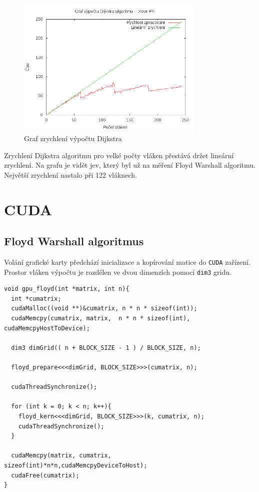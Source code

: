 \documentclass[10pt,a4paper]{article}
\begin{document}
\begin{figure}[H]
  \centering
    \includegraphics[width=0.8\textwidth]{graf_dijkstra_phi.png}
  \caption{Graf zrychlení výpočtu Dijkstra}
  \label{fig:dijkphi}
\end{figure}

Zrychlení Dijkstra algoritmu pro velké počty vláken přestává držet lineární zrychlení. Na grafu je vidět jev, který byl už na měření Floyd Warshall algoritmu. Největší zrychlení nastalo při 122 vláknech.

\section{CUDA}

\subsection{Floyd Warshall algoritmus}

Volání grafické karty předchází inicializace a kopírování matice do \texttt{CUDA} zařízení. Prostor vláken výpočtu je rozdělen ve dvou dimenzích pomocí \texttt{dim3} gridu.

\begin{verbatim}
void gpu_floyd(int *matrix, int n){
  int *cumatrix; 
  cudaMalloc((void **)&cumatrix, n * n * sizeof(int));
  cudaMemcpy(cumatrix, matrix,  n * n * sizeof(int), cudaMemcpyHostToDevice);
  
  dim3 dimGrid(( n + BLOCK_SIZE - 1 ) / BLOCK_SIZE, n);
  
  floyd_prepare<<<dimGrid, BLOCK_SIZE>>>(cumatrix, n);
  
  cudaThreadSynchronize();
     
  for (int k = 0; k < n; k++){
    floyd_kern<<<dimGrid, BLOCK_SIZE>>>(k, cumatrix, n);
    cudaThreadSynchronize();  
  }
  
  cudaMemcpy(matrix, cumatrix, sizeof(int)*n*n,cudaMemcpyDeviceToHost);  
  cudaFree(cumatrix);
}
\end{verbatim}
\end{document}

